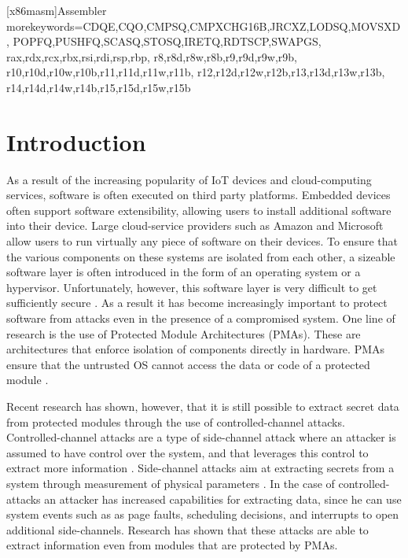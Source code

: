 
   [x86masm]{Assembler} %
   {morekeywords={CDQE,CQO,CMPSQ,CMPXCHG16B,JRCXZ,LODSQ,MOVSXD, %
                  POPFQ,PUSHFQ,SCASQ,STOSQ,IRETQ,RDTSCP,SWAPGS, %
                  rax,rdx,rcx,rbx,rsi,rdi,rsp,rbp, %
                  r8,r8d,r8w,r8b,r9,r9d,r9w,r9b, %
                  r10,r10d,r10w,r10b,r11,r11d,r11w,r11b, %
                  r12,r12d,r12w,r12b,r13,r13d,r13w,r13b, %
                  r14,r14d,r14w,r14b,r15,r15d,r15w,r15b}} %


\chapter{Introduction}
\label{cha:introduction}
As a result of the increasing popularity of IoT devices and cloud-computing services, software is often executed on third party platforms. 
Embedded devices often support software extensibility, allowing users to install additional software into their device. 
Large cloud-service providers such as Amazon and Microsoft allow users to run virtually any piece of software on their devices. 
To ensure that the various components on these systems are isolated from each other, a sizeable software layer is often introduced in the form of an operating system or 
a hypervisor.
Unfortunately, however, this software layer is very difficult to get sufficiently secure \cite{psma}.
As a result it has become increasingly important to protect software from attacks even in the presence of a compromised system. 
One line of research is the use of Protected Module Architectures (PMAs). 
These are architectures that enforce isolation of components directly in hardware.
PMAs ensure that the untrusted OS cannot access the data or code of a protected module \cite{Nemesis}. 

Recent research has shown, however, that it is still possible to extract secret data from protected modules through the use of controlled-channel attacks. 
Controlled-channel attacks are a type of side-channel attack where an attacker is assumed to have control over the system, and that leverages this control to extract more information \cite{Xu}.	
Side-channel attacks aim at extracting secrets from a system through measurement of physical parameters \cite{side-channel}. 
In the case of controlled-attacks an attacker has increased capabilities for extracting data, since he can use system events such as as page faults, scheduling decisions, and interrupts to open additional side-channels. 
Research has shown that these attacks are able to extract information even from modules that are protected by PMAs. 

